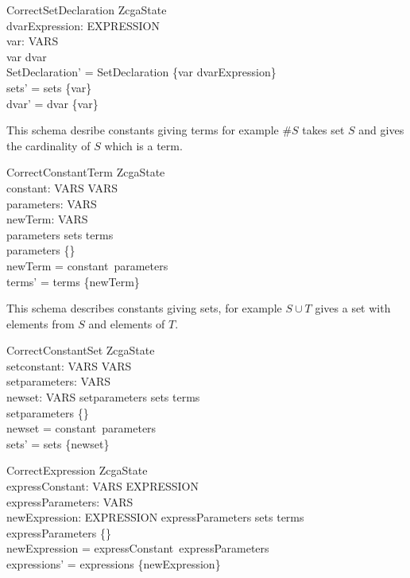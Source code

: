 \documentclass{article}
\begin{document}
\begin{schema}{CorrectSetDeclaration}
\Delta ZcgaState \\
dvarExpression: EXPRESSION \\
var: VARS \\
\where
var \notin dvar \\
SetDeclaration' = SetDeclaration \cup \{var \mapsto dvarExpression\} \\
sets' = sets \cup \{var\} \\
dvar' = dvar \cup \{var\}
\end{schema}


This schema desribe constants giving terms for example $\# S$ takes set $S$ and gives the cardinality of $S$ which is a term.

\begin{schema}{CorrectConstantTerm}
\Delta ZcgaState \\
constant:  \power VARS \pfun VARS \\
parameters: \power VARS \\
newTerm: VARS \\
\where
parameters \subseteq sets \cup terms \\
parameters \neq \{\} \\
newTerm = constant~parameters \\
terms' = terms \cup \{newTerm\}
\end{schema}

This schema describes constants giving sets, for example $S \cup T$ gives a set with elements from $S$ and elements of $T$.

\begin{schema}{CorrectConstantSet}
\Delta ZcgaState \\
setconstant: \power VARS \pfun VARS \\
setparameters: \power VARS \\
newset: VARS 
\where
setparameters \subseteq sets \cup terms \\
setparameters \neq \{\} \\
newset = constant~parameters \\
sets' = sets \cup \{newset\}
\end{schema}

\begin{schema}{CorrectExpression}
\Delta ZcgaState \\
expressConstant: \power VARS \pfun EXPRESSION \\
expressParameters: \power VARS \\
newExpression: EXPRESSION
\where
expressParameters \subseteq sets \cup terms \\
expressParameters \neq \{\} \\
newExpression = expressConstant~expressParameters \\
expressions' = expressions \cup \{newExpression\}
\end{schema}
\end{document}
